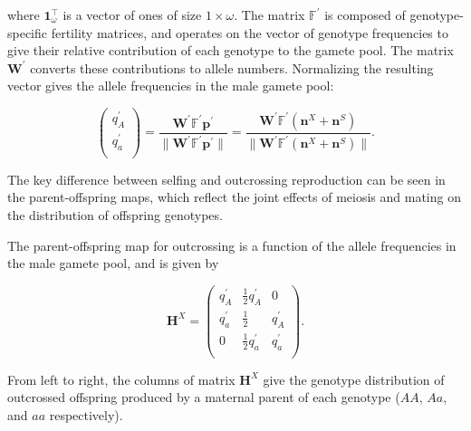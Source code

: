 \documentclass[11pt]{article}
\def\mbf#1{\mathbf{#1}}
\def\mbb#1{\mathbb{#1}}
\def\mcal#1{\mathcal{#1}}
\begin{document}
\noindent where $\mbf{1}^{\intercal}_{\omega} $ is a vector of ones of size $1 \times \omega$. The matrix $\mbb{F}^{\prime}$ is composed of genotype-specific fertility matrices, and operates on the vector of genotype frequencies to give their relative contribution of each genotype to the gamete pool. The matrix $\mbf{W}^{\prime}$ converts these contributions to allele numbers. Normalizing the resulting vector gives the allele frequencies in the male gamete pool:
\begin{linenomath*}
\begin{equation} \label{eq:maleGametePool}
	\left(
		\begin{array}{c}
			q^{\prime}_{A} \\
			q^{\prime}_{a} \\
		\end{array} \right) = 
			\frac{\mbf{W}^{\prime} \mbb{F}^{\prime} \mbf{p}^{\prime}}{\| \mbf{W}^{\prime} \mbb{F}^{\prime} \mbf{p}^{\prime} \|} = 
				\frac{\mbf{W}^{\prime} \mbb{F}^{\prime} (\mbf{n}^X + \mbf{n}^S)}{\| \mbf{W}^{\prime} \mbb{F}^{\prime} (\mbf{n}^X + \mbf{n}^S)\|}.
\end{equation}
\end{linenomath*}
The key difference between selfing and outcrossing reproduction can be seen in the parent-offspring maps, which reflect the joint effects of meiosis and mating on the distribution of offspring genotypes.

The parent-offspring map for outcrossing is a function of the allele frequencies in the male gamete pool, and is given by 
\begin{linenomath*}
\begin{equation} \label{eq:HX}
	\mbf{H}^X = 
			\left(
			\begin{array}{ccc}
				q^{\prime}_{A} & \frac{1}{2} q^{\prime}_{A} & 0 \\
				q^{\prime}_{a} & \frac{1}{2} & q^{\prime}_{A}  \\
				0 & \frac{1}{2} q^{\prime}_{a} & q^{\prime}_{a} \\
			\end{array} \right).
\end{equation}
\end{linenomath*}
\noindent From left to right, the columns of matrix $\mbf{H}^X$ give the genotype distribution of outcrossed offspring produced by a maternal parent of each genotype ($AA$, $Aa$, and $aa$ respectively).
\end{document}
